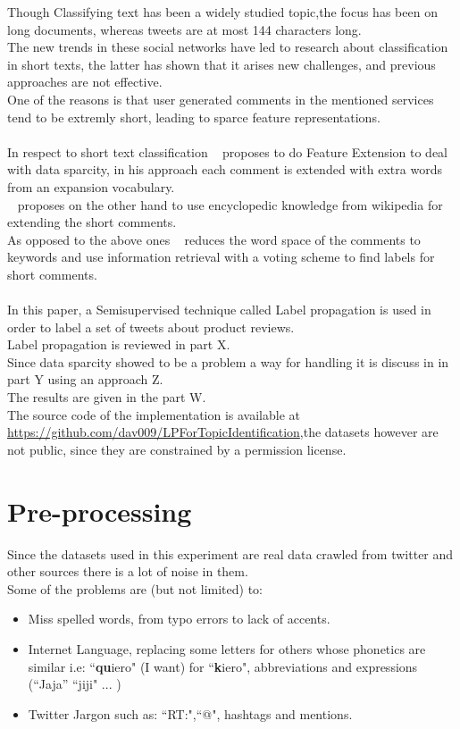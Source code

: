 \documentclass[4pt,a4paper,twocolumn]{article}
\begin{document}
Though Classifying text has been a widely studied topic,the focus has been on long documents,
whereas tweets are at most 144 characters long.\\
The new trends in these social networks have led to research about classification in short texts, the latter has  shown that it arises new challenges, and previous approaches are not  effective.\\
One of the reasons is that  user generated comments in the mentioned services tend to be extremly short, leading to sparce feature representations.\\
\\
In respect to short text classification ~\cite{Fan:2010:NMC:1916732.1917677} proposes  to do Feature Extension to deal with data sparcity, in his approach each comment is extended with extra words from an expansion vocabulary.\\
~\cite{Gabrilovich:2006:OBB:1597348.1597395} proposes on the other hand to use encyclopedic knowledge from wikipedia for extending the short comments.\\
As opposed to the above ones  ~\cite{Sun:2012:STC:2348283.2348511} reduces the word space of the comments to keywords and use information retrieval with a voting scheme to find labels for short comments.\\
\\
In this paper, a Semisupervised technique called Label propagation is used
in order to label a set of tweets about product reviews.\\
Label propagation is reviewed in part X.\\
Since data sparcity showed to be a problem a way for handling it
is discuss in in part Y using an approach Z.\\
The results are given in the part W.\\
The source code of the implementation is available at \url{https://github.com/dav009/LPForTopicIdentification},the datasets however are not public, since they are constrained by a permission license.

\part*{Pre-processing}

Since the datasets used in this experiment are real data crawled from twitter and other sources there is a lot of noise in them.\\
Some of the problems are (but not limited) to:\\
\begin{itemize}
	\item Miss spelled words, from typo errors to lack of accents.
	\item Internet Language, replacing some letters for others whose phonetics are similar i.e: ``\textbf{qu}iero" (I want) for ``\textbf{k}iero", abbreviations and expressions (``Jaja'' ``jiji" ... )
	\item Twitter Jargon such as: ``RT:",``@", hashtags and mentions. 
\end{itemize} 
\end{document}
